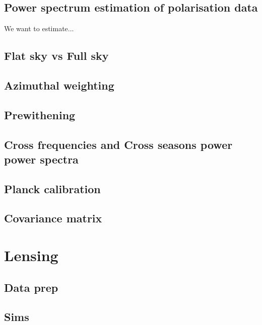 \documentclass[a4paper, 11pt]{article}
\def\ba{\begin{eqnarray}}
\def\ea{\end{eqnarray}}
\begin{document}
\subsection{Power spectrum estimation of polarisation data}

We want to estimate...

\subsection{Flat sky vs Full sky}

\subsection{Azimuthal weighting}

\subsection{Prewithening}

\subsection{Cross frequencies and Cross seasons power power spectra}

\subsection{Planck calibration}

\subsection{Covariance matrix}


 
\section{Lensing}

\subsection{Data prep}
\subsection{Sims}
\end{document}
